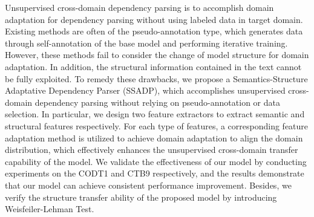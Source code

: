 Unsupervised cross-domain dependency parsing is to accomplish domain adaptation for dependency parsing without using labeled data in target domain. Existing methods are often of the pseudo-annotation type, which generates data through self-annotation of the base model and performing iterative training. However, these methods fail to consider the change of model structure for domain adaptation. In addition, the structural information contained in the text cannot be fully exploited. To remedy these drawbacks, we propose a Semantics-Structure Adaptative Dependency Parser (SSADP), which accomplishes unsupervised cross-domain dependency parsing without relying on pseudo-annotation or data selection. In particular, we design two feature extractors to extract semantic and structural features respectively. For each type of features, a corresponding feature adaptation method is utilized to achieve domain adaptation to align the domain distribution, which effectively enhances the unsupervised cross-domain transfer capability of the model. We validate the effectiveness of our model by conducting experiments on the CODT1 and CTB9 respectively, and the results demonstrate that our model can achieve consistent performance improvement. Besides, we verify the structure transfer ability of the proposed model by introducing Weisfeiler-Lehman Test.
